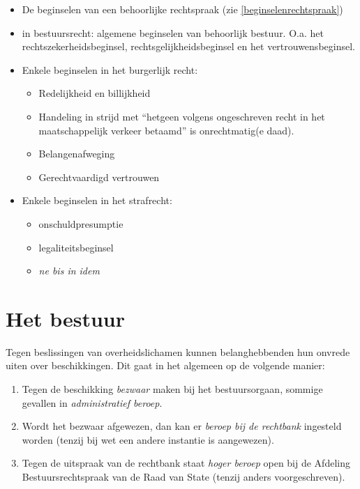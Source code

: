 \documentclass{article}
\begin{document}
\begin{itemize}

  \item De beginselen van een behoorlijke rechtspraak (zie
    \ref{beginselenrechtspraak})

  \item in bestuursrecht: algemene beginselen van behoorlijk bestuur. O.a. het
    rechtszekerheidsbeginsel, rechtsgelijkheidsbeginsel en het vertrouwensbeginsel.

  \item Enkele beginselen in het burgerlijk recht:
    \begin{itemize}
      \item Redelijkheid en billijkheid
      \item Handeling in strijd met ``hetgeen volgens ongeschreven recht in het
        maatschappelijk verkeer betaamd'' is onrechtmatig(e daad).
      \item Belangenafweging
      \item Gerechtvaardigd vertrouwen
    \end{itemize}

  \item Enkele beginselen in het strafrecht:
    \begin{itemize}
      \item onschuldpresumptie
      \item legaliteitsbeginsel
      \item \emph{ne bis in idem}
    \end{itemize}

\end{itemize}

\section{Het bestuur}

Tegen beslissingen van overheidslichamen kunnen belanghebbenden
hun onvrede uiten over beschikkingen. Dit gaat in het algemeen
op de volgende manier:

\begin{enumerate}
  \item Tegen de beschikking \emph{bezwaar} maken bij het bestuursorgaan,
    sommige gevallen in \emph{administratief beroep}.
  \item Wordt het bezwaar afgewezen, dan kan er \emph{beroep bij de rechtbank}
    ingesteld worden (tenzij bij wet een andere instantie is aangewezen).
  \item Tegen de uitspraak van de rechtbank staat \emph{hoger beroep} open
    bij de Afdeling Bestuursrechtspraak van de Raad van State (tenzij anders
    voorgeschreven).
\end{enumerate}
\end{document}
